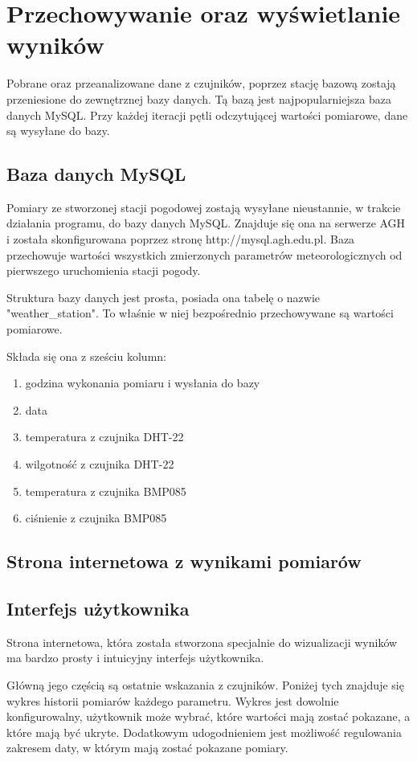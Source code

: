 \chapter{Przechowywanie oraz wyświetlanie wyników}

Pobrane oraz przeanalizowane dane z czujników, poprzez stację bazową zostają przeniesione do zewnętrznej bazy danych. Tą bazą jest najpopularniejsza baza danych MySQL. Przy każdej iteracji pętli odczytującej wartości pomiarowe, dane są wysyłane do bazy.

\section{Baza danych MySQL}
Pomiary ze stworzonej stacji pogodowej zostają wysyłane nieustannie, w trakcie działania programu, do bazy danych MySQL. Znajduje się ona na serwerze AGH i została skonfigurowana poprzez stronę http://mysql.agh.edu.pl. Baza przechowuje wartości wszystkich zmierzonych parametrów meteorologicznych od pierwszego uruchomienia stacji pogody.

Struktura bazy danych jest prosta, posiada ona tabelę o nazwie "weather\_station". To właśnie w niej bezpośrednio przechowywane są wartości pomiarowe.

Składa się ona z sześciu kolumn:
\begin{enumerate}
\item godzina wykonania pomiaru i wysłania do bazy
\item data
\item temperatura z czujnika DHT-22
\item wilgotność z czujnika DHT-22
\item temperatura z czujnika BMP085
\item ciśnienie z czujnika BMP085
\end{enumerate}

\section{Strona internetowa z wynikami pomiarów}

\section{Interfejs użytkownika}
Strona internetowa, która została stworzona specjalnie do wizualizacji wyników ma bardzo prosty i intuicyjny interfejs użytkownika.

Główną jego częścią są ostatnie wskazania z czujników. Poniżej tych znajduje się wykres historii pomiarów każdego parametru. Wykres jest dowolnie konfigurowalny, użytkownik może wybrać, które wartości mają zostać pokazane, a które mają być ukryte. Dodatkowym udogodnieniem jest możliwość regulowania zakresem daty, w którym mają zostać pokazane pomiary.